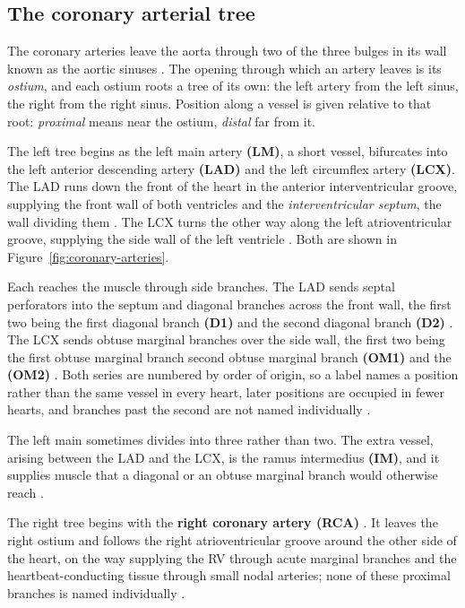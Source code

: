 \subsection{The coronary arterial tree}
\label{sec:tree}

The coronary arteries leave the aorta through two of the three bulges in its wall known as the
aortic sinuses \cite{devos2024coronary}.
The opening through which an artery leaves is its \emph{ostium}, and each ostium roots a tree of its
own: the left artery from the left sinus, the right from the right sinus.
Position along a vessel is given relative to that root: \emph{proximal} means near the ostium,
\emph{distal} far from it.

The left tree begins as the left main artery \textbf{(LM)}, a short vessel, bifurcates into the
left anterior descending artery \textbf{(LAD)} and the left circumflex artery \textbf{(LCX)}.
The LAD runs down the front of the heart in the anterior
interventricular groove, supplying the front wall of both ventricles and the
\emph{interventricular septum}, the wall dividing them \cite{devos2024coronary,obrien2007anatomy}.
The LCX turns the other way along the left atrioventricular
groove, supplying the side wall of the left ventricle \cite{obrien2007anatomy,allwork1987applied}.
Both are shown in Figure~\ref{fig:coronary-arteries}.

Each reaches the muscle through side branches.
The LAD sends septal perforators into the septum and diagonal branches across the front wall, the
first two being the first diagonal branch \textbf{ (D1)} and the second diagonal branch \textbf{ (D2)}
\cite{devos2024coronary,obrien2007anatomy}.
The LCX sends obtuse marginal branches over the side wall, the first two being the first obtuse marginal branch second obtuse marginal branch
\textbf{ (OM1)} and the \textbf{ (OM2)}
\cite{obrien2007anatomy}.
Both series are numbered by order of origin, so a label names a position rather than the same vessel
in every heart, later positions are occupied in fewer hearts, and branches past the second are not
named individually \cite{devos2024coronary}.

The left main sometimes divides into three rather than two.
The extra vessel, arising between the LAD and the LCX, is the ramus intermedius \textbf{ (IM)}, and
it supplies muscle that a diagonal or an obtuse marginal branch would otherwise reach
\cite{obrien2007anatomy}.

The right tree begins with the \textbf{right coronary artery (RCA)} \cite{obrien2007anatomy}.
It leaves the right ostium and follows the right atrioventricular groove around the other side of
the heart, on the way supplying the RV through acute marginal branches and the
heartbeat-conducting tissue through small nodal arteries; none of these proximal branches is named
individually \cite{devos2024coronary,obrien2007anatomy}.

